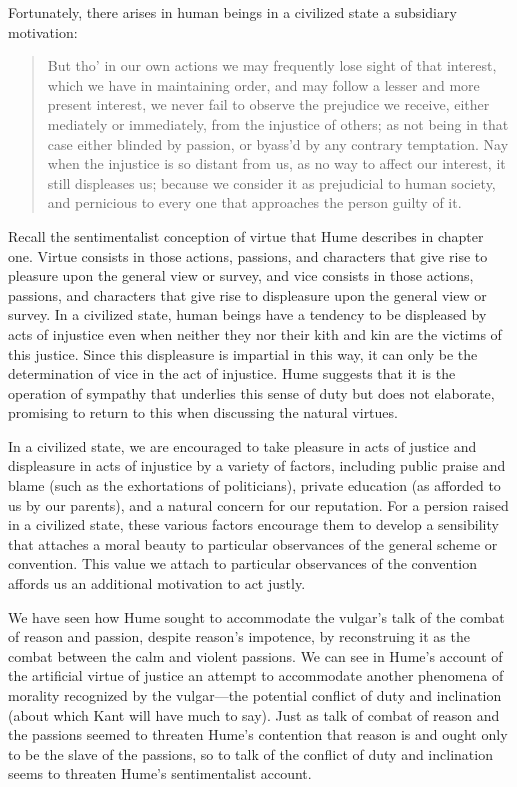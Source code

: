 Fortunately, there arises in human beings in a civilized state a subsidiary motivation:

\begin{quote}
	But tho' in our own actions we may frequently lose sight of that interest, which we have in maintaining order, and may follow a lesser and more present interest, we never fail to observe the prejudice we receive, either mediately or immediately, from the injustice of others; as not being in that case either blinded by passion, or byass'd by any contrary temptation. Nay when the injustice is so distant from us, as no way to affect our interest, it still displeases us; because we consider it as prejudicial to human society, and pernicious to every one that approaches the person guilty of it.
\end{quote}

Recall the sentimentalist conception of virtue that Hume describes in chapter one. Virtue consists in those actions, passions, and characters that give rise to pleasure upon the general view or survey, and vice consists in those actions, passions, and characters that give rise to displeasure upon the general view or survey. In a civilized state, human beings have a tendency to be displeased by acts of injustice even when neither they nor their kith and kin are the victims of this justice. Since this displeasure is impartial in this way, it can only be the determination of vice in the act of injustice. Hume suggests that it is the operation of sympathy that underlies this sense of duty but does not elaborate, promising to return to this when discussing the natural virtues.

In a civilized state, we are encouraged to take pleasure in acts of justice and displeasure in acts of injustice by a variety of factors, including public praise and blame (such as the exhortations of politicians), private education (as afforded to us by our parents), and a natural concern for our reputation. For a persion raised in a civilized state, these various factors encourage them to develop a sensibility that attaches a moral beauty to particular observances of the general scheme or convention. This value we attach to particular observances of the convention affords us an additional motivation to act justly.

We have seen how Hume sought to accommodate the vulgar’s talk of the combat of reason and passion, despite reason’s impotence, by reconstruing it as the combat between the calm and violent passions. We can see in Hume’s account of the artificial virtue of justice an attempt to accommodate another phenomena of morality recognized by the vulgar—the potential conflict of duty and inclination (about which Kant will have much to say). Just as talk of combat of reason and the passions seemed to threaten Hume’s contention that reason is and ought only to be the slave of the passions, so to talk of the conflict of duty and inclination seems to threaten Hume’s sentimentalist account.


